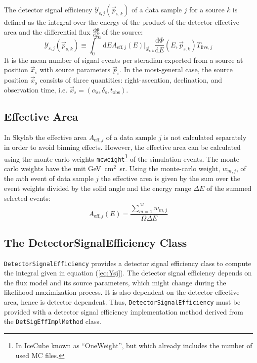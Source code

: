 \documentclass{article}
\newcommand{\eq}[1]{(\ref{#1})}
\newcommand{\code}[1]{\texttt{#1}}
\newcommand{\class}[1]{\colorbox{blue!30}{\code{#1}}}
\newcommand{\ps}{\vec{p}_{\mathrm{s}}}
\newcommand{\psk}{\vec{p}_{\mathrm{s},k}}
\newcommand{\xs}{\vec{x}_{\mathrm{s}}}
\newcommand{\xsk}{\vec{x}_{\mathrm{s},k}}
\begin{document}
The detector signal efficiency $\mathcal{Y}_{\mathrm{s},j}(\psk)$
of a data sample $j$ for a source $k$ is defined as the integral over the energy
of the product of the detector effective area and the differential flux
$\frac{\mathrm{d}\Phi}{\mathrm{d}E}$ of the source:
\begin{equation}
 \mathcal{Y}_{\mathrm{s},j}(\psk) \equiv \int_0^\infty \mathrm{d}E A_{\mathrm{eff},j}(E)|_{\xsk} \frac{\mathrm{d}\Phi}{\mathrm{d}E}(E,\psk) T_{\mathrm{live},j}
\label{eq:Ysj}
\end{equation}
It is the mean number of signal events per steradian expected from a source at
position $\xs$ with source parameters $\ps$. In the most-general case,
the source position $\xs$ consists of three quantities: right-ascention,
declination, and observation time, i.e.
$\xs = (\alpha_{\mathrm{s}},\delta_{\mathrm{s}},t_{\mathrm{obs}})$.

\subsection{Effective Area}

In Skylab the effective area $A_{\mathrm{eff},j}$ of a data sample $j$ is not
calculated separately in order to avoid binning effects. However, the effective
area can be calculated using the monte-carlo weights \code{mcweight}\footnote{In IceCube
known as ``OneWeight'', but which already includes the number of used MC files.}
of the simulation events.
The monte-carlo weights have the unit GeV~cm$^2$~sr.
Using the monte-carlo weight, $w_{m,j}$, of the $m$th event of data sample $j$
the effective area is given by the sum over the event weights divided by the
solid angle and the energy range $\Delta E$ of the summed selected events:
\begin{equation}
 A_{\mathrm{eff},j}(E) = \frac{\sum_{m=1}^{M} w_{m,j}}{\Omega \Delta E}
\end{equation}


\subsection{The DetectorSignalEfficiency Class}

\class{DetectorSignalEfficiency} provides a detector signal efficiency class to
compute the integral given in equation \eq{eq:Ysj}. The detector signal
efficiency depends on the flux model and its source parameters, which might
change during the likelihood maximization process. It is also dependent on the
detector effective area, hence is detector dependent. Thus,
\class{DetectorSignalEfficiency} must be provided with a detector signal
efficiency implementation method derived from the \class{DetSigEffImplMethod}
class.
\end{document}
